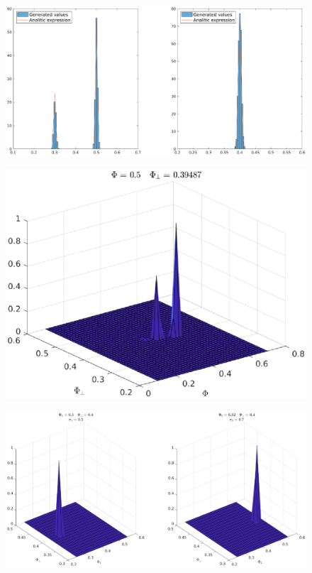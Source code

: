 \documentclass[a4paper,12pt,twoside,titlepage,openright]{book}
\begin{document}
		\begin{figure}
			\centering
			\includegraphics[width=\linewidth]{validation/2paramData.eps}
			\caption{}
			\label{val: 2paramData}
		\end{figure}
		\begin{figure}
			\centering
			\includegraphics[width=\linewidth]{validation/2param1.eps}
			\caption{}
			\label{val: 2param1}
		\end{figure}
		\begin{figure}
			\centering
			\includegraphics[width=\linewidth]{validation/2param2.eps}
			\caption{}
			\label{val: 2param2}
		\end{figure}
\end{document}
